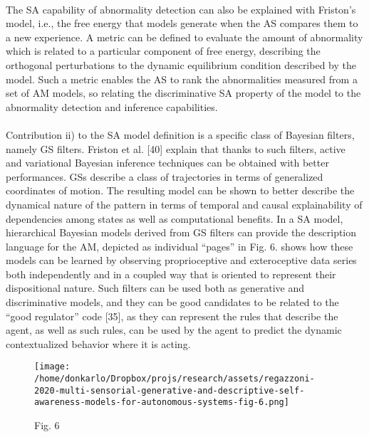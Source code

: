 \documentclass{article}
\begin{document}
		\paragraph{} The SA capability of abnormality detection can also be
		explained with Friston’s model, i.e., the free energy that
		models generate when the AS compares them to a new
		experience. A metric can be defined to evaluate the amount
		of abnormality which is related to a particular component
		of free energy, describing the orthogonal perturbations to the
		dynamic equilibrium condition described by the model. Such
		a metric enables the AS to rank the abnormalities measured
		from a set of AM models, so relating the discriminative
		SA property of the model to the abnormality detection and
		inference capabilities.
		\paragraph{}Contribution ii) to the SA model definition is a specific class
		of Bayesian filters, namely GS filters. Friston et al. [40] explain
		that thanks to such filters, active and variational Bayesian
		inference techniques can be obtained with better performances.
		GSs describe a class of trajectories in terms of generalized
		coordinates of motion. The resulting model can be shown to
		better describe the dynamical nature of the pattern in terms
		of temporal and causal explainability of dependencies among
		states as well as computational benefits. In a SA model,
		hierarchical Bayesian models derived from GS filters can
		provide the description language for the AM, depicted as
		individual “pages” in Fig. 6. \citet{regazzoni-2020-multi-sensorial-generative-and-descriptive-self-awareness-models-for-autonomous-systems} shows how these models
		can be learned by observing proprioceptive and exteroceptive
		data series both independently and in a coupled way that is
		oriented to represent their dispositional nature. Such filters can
		be used both as generative and discriminative models, and they
		can be good candidates to be related to the “good regulator”
		code [35], as they can represent the rules that describe the
		agent, as well as such rules, can be used by the agent to predict
		the dynamic contextualized behavior where it is acting.
		\begin{figure*}
			\centering
			\texttt{[image: /home/donkarlo/Dropbox/projs/research/assets/regazzoni-2020-multi-sensorial-generative-and-descriptive-self-awareness-models-for-autonomous-systems-fig-6.png]}
			\caption{\citet{regazzoni-2020-multi-sensorial-generative-and-descriptive-self-awareness-models-for-autonomous-systems} Fig. 6}
			\label{fig:regazzoni-2020-multi-sensorial-generative-and-descriptive-self-awareness-models-for-autonomous-systems-fig-6.png}
		\end{figure*}
\end{document}
